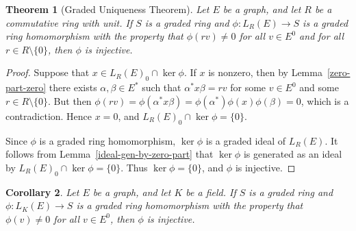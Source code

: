 \documentclass[11pt]{amsart}
\newtheorem{theorem}{Theorem}[section]
\newtheorem{corollary}[theorem]{Corollary}
\theoremstyle{remark}
\numberwithin{equation}{section}
\begin{document}
\begin{theorem}[Graded Uniqueness Theorem] \label{GUT}
Let $E$ be a graph, and let $R$ be a commutative ring with unit.  If $S$ is a graded ring and $\phi : L_R(E) \to S$ is a graded ring homomorphism with the property that $\phi(rv) \neq 0$ for all $v \in E^0$ and for all $r \in R \setminus \{ 0 \}$, then $\phi$ is injective.
\end{theorem}

\begin{proof}
Suppose that $x \in L_R(E)_0 \cap \ker \phi$.  If $x$ is nonzero, then by Lemma~\ref{zero-part-zero} there exists $\alpha, \beta \in E^*$ such that $\alpha^* x \beta = rv$ for some $v \in E^0$ and some $r \in R \setminus \{ 0 \}$.  But then $\phi(rv) = \phi(\alpha^* x \beta) = \phi(\alpha^*) \phi(x) \phi(\beta) = 0$, which is a contradiction.  Hence $x = 0$, and $L_R(E)_0 \cap \ker \phi = \{ 0 \}$.

Since $\phi$ is a graded ring homomorphism, $\ker \phi$ is a graded ideal of $L_R(E)$.  It follows from Lemma~\ref{ideal-gen-by-zero-part} that $\ker \phi$ is generated as an ideal by $L_R(E)_0 \cap \ker \phi = \{ 0 \}$.  Thus $\ker \phi = \{ 0 \}$, and $\phi$ is injective.
\end{proof}

\begin{corollary}
Let $E$ be a graph, and let $K$ be a field.  If $S$ is a graded ring and $\phi : L_K(E) \to S$ is a graded ring homomorphism with the property that $\phi(v) \neq 0$ for all $v \in E^0$, then $\phi$ is injective.
\end{corollary}
\end{document}
